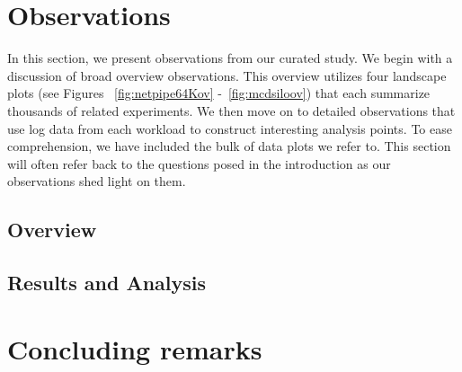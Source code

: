 \section{Observations}

In this section,
we present observations from our curated study.
We begin with a discussion of broad overview observations.
This overview utilizes four landscape plots (see Figures ~\ref{fig:netpipe64Kov} -~\ref{fig:mcdsiloov}) that each summarize thousands of related  experiments.
We then move on to detailed observations that use log data from each workload
to construct interesting analysis points.
To ease comprehension, we have included the bulk of data plots we refer to.  
This section will often refer back to the questions posed in the introduction
as our observations shed light on them.

\subsection{Overview}
\label{sec:resoverview}


\subsection{Results and Analysis}
\label{sec:analysis}


%
%
%

%

\section{Concluding remarks}



\newpage





